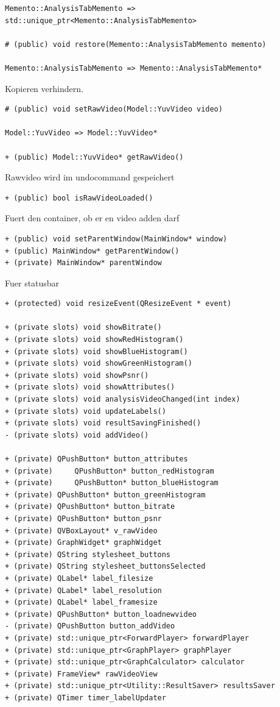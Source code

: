 \documentclass{scrartcl}
\begin{document}
{\begin{verbatim}
Memento::AnalysisTabMemento => std::unique_ptr<Memento::AnalysisTabMemento>

# (public) void restore(Memento::AnalysisTabMemento memento)

Memento::AnalysisTabMemento => Memento::AnalysisTabMemento*
\end{verbatim}
Kopieren verhindern.
\begin{verbatim}
# (public) void setRawVideo(Model::YuvVideo video)

Model::YuvVideo => Model::YuvVideo*

+ (public) Model::YuvVideo* getRawVideo()
\end{verbatim}
Rawvideo wird im undocommand gespeichert
\begin{verbatim}
+ (public) bool isRawVideoLoaded()
\end{verbatim}
Fuert den container, ob er en video adden darf
\begin{verbatim}
+ (public) void setParentWindow(MainWindow* window)
+ (public) MainWindow* getParentWindow()
+ (private) MainWindow* parentWindow
\end{verbatim}
Fuer statusbar
\begin{verbatim}
+ (protected) void resizeEvent(QResizeEvent * event)

+ (private slots) void showBitrate()
+ (private slots) void showRedHistogram()
+ (private slots) void showBlueHistogram()
+ (private slots) void showGreenHistogram()
+ (private slots) void showPsnr()
+ (private slots) void showAttributes()
+ (private slots) void analysisVideoChanged(int index)
+ (private slots) void updateLabels()
+ (private slots) void resultSavingFinished()
- (private slots) void addVideo()

+ (private) QPushButton* button_attributes
+ (private) 	QPushButton* button_redHistogram
+ (private) 	QPushButton* button_blueHistogram
+ (private) QPushButton* button_greenHistogram
+ (private) QPushButton* button_bitrate
+ (private) QPushButton* button_psnr
+ (private) QVBoxLayout* v_rawVideo
+ (private) GraphWidget* graphWidget
+ (private) QString stylesheet_buttons
+ (private) QString stylesheet_buttonsSelected
+ (private) QLabel* label_filesize
+ (private) QLabel* label_resolution
+ (private) QLabel* label_framesize
+ (private) QPushButton* button_loadnewvideo
- (private) QPushButton button_addVideo
+ (private) std::unique_ptr<ForwardPlayer> forwardPlayer
+ (private) std::unique_ptr<GraphPlayer> graphPlayer
+ (private) std::unique_ptr<GraphCalculator> calculator
+ (private) FrameView* rawVideoView
+ (private) std::unique_ptr<Utility::ResultSaver> resultsSaver
+ (private) QTimer timer_labelUpdater
	

\end{verbatim}}
\end{document}
